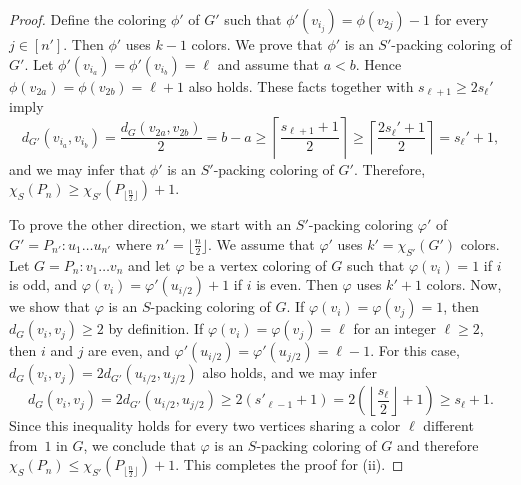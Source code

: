 \documentclass[12pt]{article}
\begin{document}
\begin{proof}
   Define the coloring $\phi'$ of $G'$ such that $\phi'(v_{i_j})= \phi(v_{2j})-1$ for every $j \in [n']$.  Then $\phi'$ uses $k-1$ colors. We prove that $\phi'$ is an $S'$-packing coloring of $G'$. Let $\phi'(v_{i_a})= \phi'(v_{i_b})= \ell$ and assume that $a <b$. Hence $\phi(v_{2a})= \phi(v_{2b})= \ell+1$ also holds. These facts together with $s_{\ell+1}\ge 2s_\ell'$ imply
    $$ d_{G'}(v_{i_a}, v_{i_b})=\frac{ d_{G}(v_{2a}, v_{2b})}{2} =b-a \ge \left\lceil \frac{ s_{\ell+1}+1}{2} \right\rceil \ge
    \left\lceil \frac{2 s_{\ell}'+1}{2} \right\rceil =  s_\ell'+1, 
    $$
    and we may infer that $\phi'$ is an $S'$-packing coloring of $G'$. Therefore, $\chi_S(P_n)\ge \chi_{S'}(P_{\lfloor \frac{n}{2} \rfloor} )+1$.

    To prove the other direction, we start with an $S'$-packing coloring $\varphi'$ of $G'= P_{n'} \colon u_1 \dots u_{n'}$ where $n'= \lfloor \frac{n}{2} \rfloor$. We assume that $\varphi'$ uses $k'=\chi_{S'}(G')$ colors. Let $G=P_n \colon v_1\dots v_n$ and let $\varphi$ be a vertex coloring of $G$ such that $\varphi(v_i)=1$ if $i$ is odd, and $\varphi(v_i)=\varphi'(u_{i/2})+1$ if $i$ is even. Then $\varphi$ uses $k'+1$ colors. Now, we show that $\varphi$ is an $S$-packing coloring of $G$. If $\varphi(v_i)=\varphi(v_j)=1$, then $d_G(v_i, v_j) \ge 2$ by definition. If $\varphi(v_i)=\varphi(v_j)=\ell$ for an integer $\ell\ge 2$, then $i$ and $j$ are even, and $\varphi'(u_{i/2})=\varphi'(u_{j/2})= \ell-1$. For this case, $d_G(v_i, v_j)=2 d_{G'}(u_{i/2}, u_{j/2}) $ also holds, and we may infer
    $$ d_G(v_i, v_j)=2 d_{G'}(u_{i/2}, u_{j/2}) \ge 2 (s'_{\ell-1}+1) = 2 \left(\left\lfloor \frac{s_\ell}{2} \right\rfloor +1 \right)\ge s_\ell +1. 
    $$
    Since this inequality holds for every two vertices sharing a color $\ell$ different from~$1$ in $G$, we conclude that $\varphi$ is an $S$-packing coloring of $G$ and therefore $\chi_S(P_n) \leq \chi_{S'}(P_{\lfloor \frac{n}{2} \rfloor} )+1$. This completes the proof for (ii).  
\end{proof}
\end{document}
